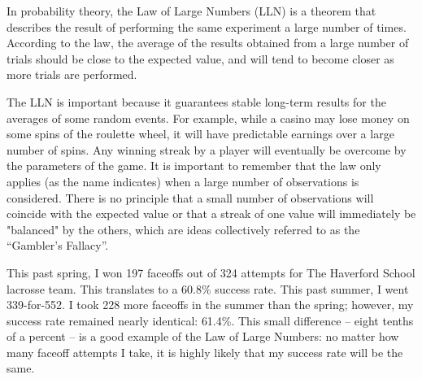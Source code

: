 
In probability theory, the Law of Large Numbers (LLN) is a theorem that describes the result of performing the same experiment a large number of times. According to the law, the average of the results obtained from a large number of trials should be close to the expected value, and will tend to become closer as more trials are performed.

The LLN is important because it guarantees stable long-term results for the averages of some random events. For example, while a casino may lose money on some spins of the roulette wheel, it will have predictable earnings over a large number of spins. Any winning streak by a player will eventually be overcome by the parameters of the game. It is important to remember that the law only applies (as the name indicates) when a large number of observations is considered. There is no principle that a small number of observations will coincide with the expected value or that a streak of one value will immediately be "balanced" by the others, which are ideas collectively referred to as the “Gambler’s Fallacy”.

This past spring, I won 197 faceoffs out of 324 attempts for The Haverford School lacrosse team. This translates to a 60.8\% success rate. This past summer, I went 339-for-552. I took 228 more faceoffs in the summer than the spring; however, my success rate remained nearly identical: 61.4\%. This small difference – eight tenths of a percent – is a good example of the Law of Large Numbers: no matter how many faceoff attempts I take, it is highly likely that my success rate will be the same. 
